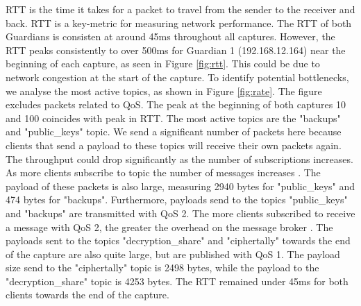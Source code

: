 \ac{RTT} is the time it takes for a packet to travel from the sender to the receiver and back. \ac{RTT} is a key-metric for measuring network performance. The \ac{RTT} of both Guardians is consisten at around 45ms throughout all captures. However, the \ac{RTT} peaks consistently to over 500ms for Guardian 1 (192.168.12.164) near the beginning of each capture, as seen in Figure \ref{fig:rtt}. This could be due to network congestion at the start of the capture. To identify potential bottlenecks, we analyse the most active topics, as shown in Figure \ref{fig:rate}. The figure excludes packets related to \ac{QoS}. The peak at the beginning of both captures 10 and 100 coincides with peak in \ac{RTT}. The most active topics are the "backups" and "public\_keys" topic. We send a significant number of packets here because clients that send a payload to these topics will receive their own packets again. The throughput could drop significantly as the number of subscriptions increases. As more clients subscribe to topic the number of messages increases \cite[19,21,22]{protocols}. The payload of these packets is also large, measuring 2940 bytes for "public\_keys" and 474 bytes for "backups". Furthermore, payloads send to the topics "public\_keys" and "backups" are transmitted with \ac{QoS} 2. The more clients subscribed to receive a message with \ac{QoS} 2, the greater the overhead on the message broker \cite[11]{protocols}. The payloads sent to the topics "decryption\_share" and "ciphertally" towards the end of the capture are also quite large, but are published with \ac{QoS} 1. The payload size send to the "ciphertally" topic is 2498 bytes, while the payload to the "decryption\_share" topic is 4253 bytes. The \ac{RTT} remained under 45ms for both clients towards the end of the capture.
